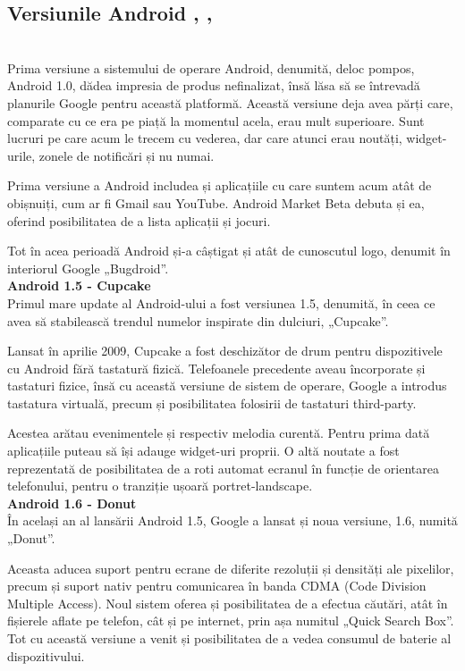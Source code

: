 \documentclass[12pt,a4paper]{article}
\begin{document}
\newpage
\subsection{Versiunile Android \cite{AndroidVersionsHistory}, \cite{AndroidHistory}, \cite{DeveloperAndroid}}
\\
Prima versiune a sistemului de operare Android, denumită, deloc pompos, Android 1.0, dădea impresia de produs nefinalizat, însă lăsa să se întrevadă planurile Google pentru această platformă. Această versiune deja avea părți care, comparate cu ce era  pe piață la momentul acela, erau mult superioare. Sunt lucruri pe care acum le trecem cu vederea, dar care atunci erau noutăți, widget-urile, zonele de notificări și nu numai. 

Prima versiune a Android includea și aplicațiile cu care suntem acum atât de obișnuiți, cum ar fi Gmail sau YouTube. Android Market Beta debuta și ea, oferind posibilitatea de a lista aplicații și jocuri.

Tot în acea perioadă Android și-a câștigat și atât de cunoscutul logo, denumit în interiorul Google „Bugdroid”.\\

\textbf{Android 1.5 - Cupcake}\\
Primul mare update al Android-ului a fost versiunea 1.5, denumită, în ceea ce avea să stabilească trendul numelor inspirate din dulciuri, „Cupcake”.

	Lansat în aprilie 2009, Cupcake a fost deschizător de drum pentru dispozitivele cu Android fără tastatură fizică. Telefoanele precedente aveau încorporate și tastaturi fizice, însă cu această versiune de sistem de operare, Google a introdus tastatura virtuală, precum și posibilitatea folosirii de tastaturi third-party.

	Acestea arătau evenimentele și respectiv melodia curentă. Pentru prima dată aplicațiile puteau să își adauge widget-uri proprii. O altă noutate a fost reprezentată de posibilitatea de a roti automat ecranul în funcție de orientarea telefonului, pentru o tranziție ușoară portret-landscape.\\

\textbf{Android 1.6 - Donut}\\
În același an al lansării Android 1.5, Google a lansat și noua versiune, 1.6, numită „Donut”.
	
	Aceasta aducea suport pentru ecrane de diferite rezoluții și densități ale pixelilor, precum și suport nativ pentru comunicarea în banda CDMA (Code Division Multiple Access). Noul sistem oferea și posibilitatea de a efectua căutări, atât în fișierele aflate pe telefon, cât și pe internet, prin așa numitul „Quick Search Box”. Tot cu această versiune a venit și posibilitatea de a vedea consumul de baterie al dispozitivului.
	
\end{document}
